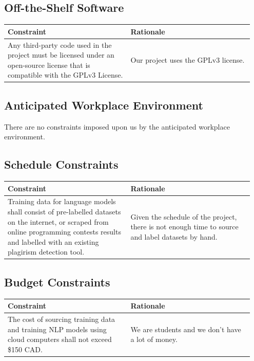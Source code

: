 \documentclass[12pt]{article}
\begin{document}
\subsection{Off-the-Shelf Software}
\begin{table}[h!]
    \centering
    \begin{tabular}{| p{0.475\linewidth} | p{0.475\linewidth} |}
    \hline
    \textbf{Constraint}   & \textbf{Rationale} \\
    \hline
    Any third-party code used in the project must be licensed under an open-source license that is compatible with the GPLv3 License. &
    Our project uses the GPLv3 license. \\
    \hline
    \end{tabular}
\end{table}

\subsection{Anticipated Workplace Environment}
There are no constraints imposed upon us by the anticipated workplace environment.


\subsection{Schedule Constraints}
\begin{table}[h!]
    \centering
    \begin{tabular}{| p{0.475\linewidth} | p{0.475\linewidth} |}
    \hline
    \textbf{Constraint}   & \textbf{Rationale} \\
    \hline
    Training data for language models shall consist of pre-labelled datasets on the internet, or scraped from online programming contests results and labelled with an existing plagirism detection tool. &
    Given the schedule of the project, there is not enough time to source and label datasets by hand. \\
    \hline
    \end{tabular}
\end{table}


\subsection{Budget Constraints}
\begin{table}[h!]
    \centering
    \begin{tabular}{| p{0.475\linewidth} | p{0.475\linewidth} |}
    \hline
    \textbf{Constraint}   & \textbf{Rationale} \\
    \hline
    The cost of sourcing training data and training NLP models using cloud computers shall not exceed \$150 CAD. &
    We are students and we don't have a lot of money. \\
    \hline
    \end{tabular}
\end{table}
\end{document}
